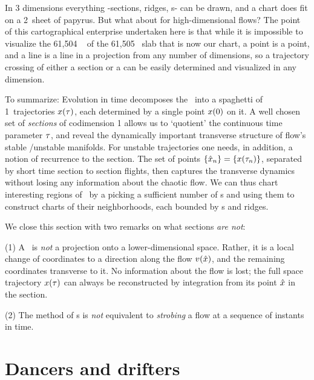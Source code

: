 \documentclass[aip,cha,reprint,
secnumarabic,
nofootinbib, tightenlines,
nobibnotes, showkeys, showpacs,
groupedaddress
]{revtex4-1}
\begin{document}
In 3 dimensions everything -sections, ridges, \poincBord s- can be
drawn, and a chart does fit on a 2\dmn\ sheet of
papyrus. But what about for high-dimensional flows? The point of this
cartographical enterprise undertaken here is that while it is impossible to
visualize the 61,504%
\dmn\ {\poincBord} of the 61,505%
\dmn\ slab that is now our chart, a point is a point,
and a line is a line in a projection from any number of dimensions, so a
trajectory crossing of either a section or a {\poincBord} can be easily
determined and visualized in any dimension.

To summarize:
Evolution in time decomposes the \statesp\ into a spaghetti of 1\dmn\
trajectories $x(\tau)$, each determined by a single point $x(0)$
on it. A well chosen set of \emph{sections} of codimension 1 allows us to
`quotient' the continuous time parameter $\tau$, and reveal the
dynamically important transverse structure of flow's stable /unstable
manifolds. For unstable trajectories one needs, in addition, a notion of
recurrence to the section. The set of points $\{\hat{x}_n\} =
\{x(\tau_n)\}$,  separated by short time section to section flights,
then captures the transverse dynamics without losing any information
about the chaotic flow. We can thus chart interesting regions of \statesp\ by
a picking a sufficient number of \template s and using them to construct charts
of their neighborhoods, each bounded by \poincBord s and ridges.

We close this section with two remarks on what sections \emph{are not}:

(1) A \PoincSec\ is {\em not} a projection onto a lower-dimensional
space. Rather, it is a local change of coordinates to a direction along
the flow $v(\hat{x})$, and the remaining coordinates transverse to it.
No information about the flow is lost; the full space trajectory
$x(\tau)$ can always be reconstructed by integration from its point
$\hat{x}$ in the section.

(2) The method of \PoincSec s is {\em not} equivalent to \emph{strobing}
a flow at a sequence of instants in time. 


\section{Dancers and drifters}
\label{s:symm}
\end{document}
